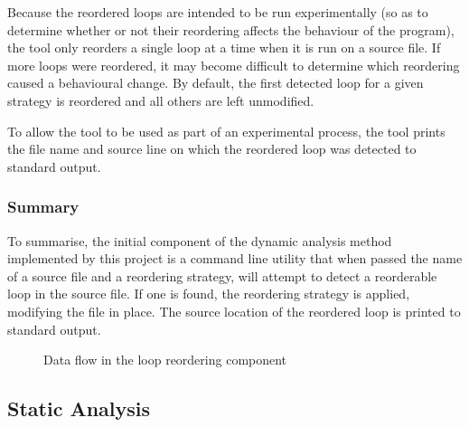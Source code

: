 \documentclass[journal]{IEEEtran}
\begin{document}
Because the reordered loops are intended to be run experimentally (so as to
determine whether or not their reordering affects the behaviour of the program),
the tool only reorders a single loop at a time when it is run on a source file.
If more loops were reordered, it may become difficult to determine which
reordering caused a behavioural change. By default, the first detected loop for
a given strategy is reordered and all others are left unmodified.

To allow the tool to be used as part of an experimental process, the tool prints
the file name and source line on which the reordered loop was detected to
standard output.

\subsubsection{Summary}

To summarise, the initial component of the dynamic analysis method implemented
by this project is a command line utility that when passed the name of a source
file and a reordering strategy, will attempt to detect a reorderable loop in the
source file. If one is found, the reordering strategy is applied, modifying the
file in place. The source location of the reordered loop is printed to standard
output.

\begin{figure}[h] 
  \centering 
  \caption{Data flow in the loop reordering component}
  \label{fig:tool}
\end{figure}


\subsection{Static Analysis} \label{ssec:static}
\end{document}

